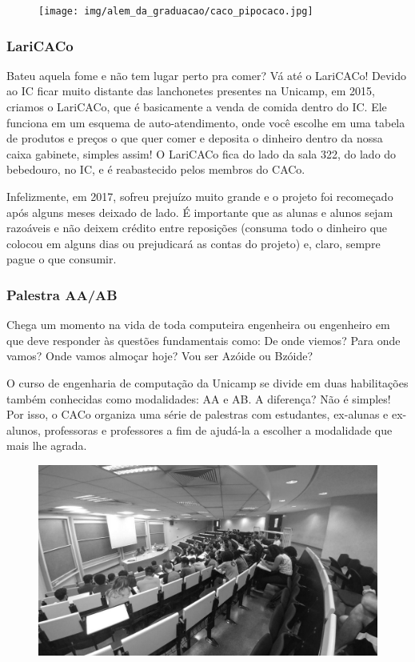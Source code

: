 \begin{figure}[H]
  \centering
  \texttt{[image: img/alem\_da\_graduacao/caco\_pipocaco.jpg]}
\end{figure}

\subsubsection{LariCACo}

Bateu aquela fome e não tem lugar perto pra comer? Vá até o LariCACo! Devido ao
IC ficar muito distante das lanchonetes presentes na Unicamp, em 2015, criamos
o LariCACo, que é basicamente a venda de comida dentro do IC. Ele funciona em
um esquema de auto-atendimento, onde você escolhe em uma tabela de produtos e
preços o que quer comer e deposita o dinheiro dentro da nossa caixa gabinete,
simples assim! O LariCACo fica do lado da sala 322, do lado do bebedouro, no 
IC, e é reabastecido pelos membros do CACo.

Infelizmente, em 2017, sofreu prejuízo muito grande e o projeto foi recomeçado
após alguns meses deixado de lado. É importante que as alunas e alunos sejam
razoáveis e não deixem crédito entre reposições (consuma todo o dinheiro que
colocou em alguns dias ou prejudicará as contas do projeto) e, claro, sempre
pague o que consumir.

\subsubsection{Palestra AA/AB}

Chega um momento na vida de toda computeira engenheira ou engenheiro em que
deve responder às questões fundamentais como: De onde viemos? Para onde vamos?
Onde vamos almoçar hoje? Vou ser Azóide ou Bzóide?

O curso de engenharia de computação da Unicamp se divide em duas habilitações
também conhecidas como modalidades: AA e AB. A diferença? Não é simples! Por
isso, o CACo organiza uma série de palestras com estudantes, ex-alunas e
ex-alunos, professoras e professores a fim de ajudá-la a escolher a modalidade
que mais lhe agrada.

\begin{figure}[H]
  \centering
  \includegraphics[width=.45\textwidth]{img/alem_da_graduacao/caco_aaab.jpg}
\end{figure}


